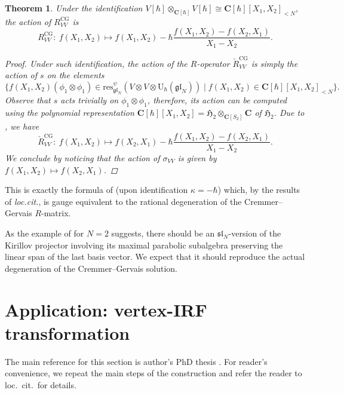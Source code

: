 \documentclass[10pt,a4paper]{article}
\numberwithin{equation}{section}
\newtheorem{Theorem}{Theorem}[section]
\newcommand{\CG}{\mathrm{CG}}
\newcommand{\C}{\mathbf{C}}
\newcommand{\U}{\mathrm{U}_{\hbar}}
\renewcommand{\sl}{\mathfrak{sl}}
\newcommand{\res}{\mathrm{res}}
\newcommand{\gl}{\mathfrak{gl}}
\begin{document}
	\begin{Theorem}
		\label{thm:the_cremmer_gervais_solution}
		Under the identification $V[\hbar] \otimes_{\C[\hbar]} V[\hbar] \cong \C[\hbar][X_1,X_2]_{<N}$, the action of $R^{\CG}_{VV}$ is
		\[
		R^{\CG}_{VV}\colon\ f(X_1, X_2) \mapsto f(X_1,X_2) - \hbar \frac{f(X_1,X_2) - f(X_2,X_1)}{X_1-X_2}.
		\]
		\begin{proof}
			Under such identification, the action of the $R$-operator $\check{R}^{\CG}_{VV}$ is simply the action of $s$ on the elements
			\[
			\{f(X_1,X_2)(\phi_1 \otimes \phi_1) \in \res^{\psi}_{\gl_N} (V \otimes V \otimes \U(\gl_N)) \mid f(X_1,X_2) \in \C[\hbar][X_1,X_2]_{<N}\}.
			\]
			Observe that $s$ acts trivially on $\phi_1\otimes \phi_1$, therefore, its action can be computed using the polynomial representation $\C[\hbar][X_1,X_2] = \mathfrak{H}_2 \otimes_{\C[S_2]} \C$ of $\mathfrak{H}_2$. Due to \cite[Proposition 1.8]{KirillovHecke}, we have
			\[
			\check{R}^{\CG}_{VV} \colon\ f(X_1,X_2) \mapsto f(X_2,X_1) - \hbar \frac{f(X_1,X_2) - f(X_2,X_1)}{X_1 - X_2}.
			\]
			We conclude by noticing that the action of $\sigma_{VV}$ is given by $f(X_1,X_2) \mapsto f(X_2,X_1)$.
		\end{proof}
	\end{Theorem}
	
	This is exactly the formula of \cite[Theorem 1.1]{EndelmanHodges} (upon identification $\kappa=-\hbar$) which, by the results of \emph{loc.cit.}, is gauge equivalent to the rational degeneration of the Cremmer--Gervais $R$-matrix.
	
	\begin{Remark}
		As the example of \cite[Proposition 2.7.13]{Kalmykov} for $N=2$ suggests, there should be an $\sl_N$-version of the Kirillov projector involving its maximal parabolic subalgebra preserving the linear span of the last basis vector. We expect that it should reproduce the actual degeneration of the Cremmer--Gervais solution.
	\end{Remark}
	
	
	\section{Application: vertex-IRF transformation}
	\label{sect::vertex_irf}
	
	The main reference for this section is author's PhD thesis \cite{Kalmykov}. For reader's convenience, we repeat the main steps of the construction and refer the reader to loc.\ cit.\  for details.
	
\end{document}
